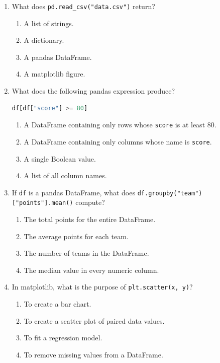 \documentclass[12pt]{article}
\begin{document}
\begin{enumerate}[label=\arabic*.]
\item What does \texttt{pd.read\_csv("data.csv")} return?
\begin{enumerate}[label=\Alph*.]
\item A list of strings.
\item A dictionary.
\item A pandas DataFrame.
\item A matplotlib figure.
\end{enumerate}

\newpage

\item What does the following pandas expression produce?
\begin{lstlisting}[language=Python]
df[df["score"] >= 80]
\end{lstlisting}
\begin{enumerate}[label=\Alph*.]
\item A DataFrame containing only rows whose \texttt{score} is at least 80.
\item A DataFrame containing only columns whose name is \texttt{score}.
\item A single Boolean value.
\item A list of all column names.
\end{enumerate}

\item If \texttt{df} is a pandas DataFrame, what does \texttt{df.groupby("team")["points"].mean()} compute?
\begin{enumerate}[label=\Alph*.]
\item The total points for the entire DataFrame.
\item The average points for each team.
\item The number of teams in the DataFrame.
\item The median value in every numeric column.
\end{enumerate}

\item In matplotlib, what is the purpose of \texttt{plt.scatter(x, y)}?
\begin{enumerate}[label=\Alph*.]
\item To create a bar chart.
\item To create a scatter plot of paired data values.
\item To fit a regression model.
\item To remove missing values from a DataFrame.
\end{enumerate}


\end{enumerate}
\end{document}

